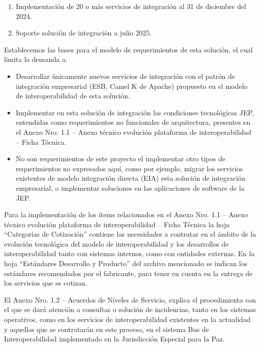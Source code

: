 \documentclass[
  paper=a4,
  ,captions=tableheading
]{scrartcl}
\providecommand{\tightlist}{%
  \setlength{\itemsep}{0pt}\setlength{\parskip}{0pt}}
\begin{document}
\begin{enumerate}
\def\labelenumi{\arabic{enumi}.}
\tightlist
\item
  Implementación de 20 o más servicios de integración al 31 de diciembre
  del 2024.
\item
  Soporte solución de integración a julio 2025.
\end{enumerate}

Establecemos las bases para el modelo de requerimientos de esta
solución, el cual limita la demanda a:

\begin{itemize}
\tightlist
\item
  Desarrollar únicamente nuevos servicios de integración con el patrón
  de integración empresarial (ESB, Camel K de Apache) propuesto en el
  modelo de interoperabilidad de esta solución.
\item
  Implementar en esta solución de integración las condiciones
  tecnológicas JEP, entendidas como requerimientos no funcionales de
  arquitectura, presentes en el Anexo Nro. 1.1 -- Anexo técnico
  evolución plataforma de interoperabilidad -- Ficha Técnica.
\item
  No son requerimientos de este proyecto el implementar otro tipos de
  requerimientos no expresados aquí, como por ejemplo, migrar los
  servicios existentes de modelo integración directa (EIA) esta solución
  de integración empresarial, o implementar soluciones en las
  aplicaciones de software de la JEP.
\end{itemize}

Para la implementación de los ítems relacionados en el Anexo Nro. 1.1 --
Anexo técnico evolución plataforma de interoperabilidad -- Ficha Técnica
la hoja ``Categorías de Cotización'' contiene las necesidades a
contratar en el ámbito de la evolución tecnológica del modelo de
interoperabilidad y los desarrollos de interoperabilidad tanto con
sistemas internos, como con entidades externas. En la hoja ``Estándares
Desarrollo y Producto'' del archivo mencionado se indican los estándares
recomendados por el fabricante, para tener en cuenta en la entrega de
los servicios que se cotizan.

El Anexo Nro. 1.2 -- Acuerdos de Niveles de Servicio, explica el
procedimiento con el que se dará atención a consultas o solución de
incidencias, tanto en los sistemas operativos, como en los servicios de
interoperabilidad existentes en la actualidad y aquellos que se
contratarán en este proceso, en el sistema Bus de Interoperabilidad
implementado en la Jurisdicción Especial para la Paz.
\end{document}
